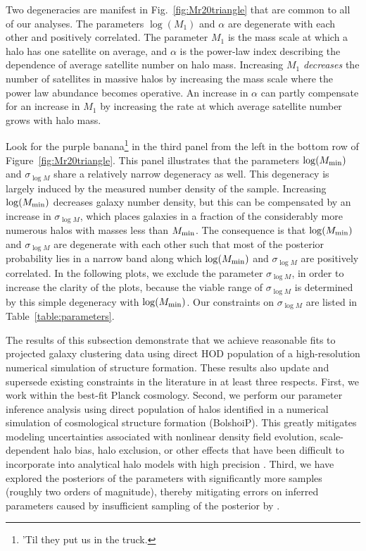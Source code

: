 \documentclass[usenatbib,usegraphicx,letterpaper]{mn2e}
\begin{document}
Two degeneracies are manifest in Fig.~\ref{fig:Mr20triangle} that are common to all of our
analyses. The parameters $\log (M_1)$ and $\alpha$ are degenerate with each other and positively
correlated. The parameter $M_1$ is the mass scale at which a halo has one satellite on
average, and $\alpha$ is the power-law index describing the dependence of average satellite
number on halo mass. Increasing $M_1$ {\em decreases} the number of satellites in massive halos
by increasing the mass scale where the power law abundance becomes operative. 
An increase in $\alpha$ can partly
compensate for an increase in $M_1$ by increasing 
the rate at which average satellite number
grows with halo mass.


Look for the purple banana\footnote{'Til they put us in the truck.} in the third panel from the left in 
the bottom row of Figure~\ref{fig:Mr20triangle}. This panel illustrates that the parameters
$\log (M_{\rm min})$ and $\sigma_{\log M}$ share a relatively narrow degeneracy as well.
This degeneracy is largely induced by the measured
number density of the sample. Increasing $\log (M_{\rm min})$ decreases galaxy
number density, but this can be compensated by an increase in $\sigma_{\log M}$, which
places galaxies in a fraction of the considerably more numerous halos with masses less
than $M_{\rm min}$. The consequence is that $\log (M_{\rm min})$ and $\sigma_{\log M}$ are
degenerate with each other such that most of the posterior probability lies in a narrow band
along which $\log (M_{\rm min})$ and $\sigma_{\log M}$ are positively correlated.
In the following plots, we exclude the parameter $\sigma_{\log M}$,
in order to increase the clarity of the plots, because the viable range of $\sigma_{\log M}$ is
determined by this simple degeneracy with $\log (M_{\rm min})$. Our constraints on $\sigma_{\log M}$ are listed in Table~\ref{table:parameters}.


The results of this subsection demonstrate that we achieve reasonable fits to projected galaxy clustering
data using direct HOD population of a high-resolution numerical simulation of structure formation. These results
also update and supersede existing constraints in the literature in at least three respects. First, we work within the
best-fit Planck cosmology. Second, we perform our parameter inference analysis using direct population of halos
identified in a numerical simulation of cosmological structure formation (BolshoiP). This greatly mitigates modeling
uncertainties associated with nonlinear density field evolution, scale-dependent halo bias, halo exclusion,
or other effects that have been difficult to incorporate into analytical halo models with high precision
\citep[e.g.,][and references therein]{vdBosch13}. Third,
we have explored the posteriors of the parameters with significantly more samples (roughly two orders of magnitude),
thereby mitigating errors on inferred parameters caused by insufficient sampling of the
posterior by \citet{zehavi_etal11}.
\end{document}
